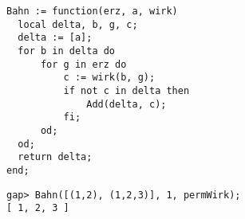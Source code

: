 \documentclass{article}
\begin{document}
\begin{lstlisting}[language=GAPsrc]
Bahn := function(erz, a, wirk)
  local delta, b, g, c;
  delta := [a];
  for b in delta do
      for g in erz do
          c := wirk(b, g);
          if not c in delta then
              Add(delta, c);
          fi;
      od;
  od;
  return delta;
end;
\end{lstlisting}

\begin{lstlisting}[language=GAPlog]
gap> Bahn([(1,2), (1,2,3)], 1, permWirk);
[ 1, 2, 3 ]
\end{lstlisting}
\end{document}
